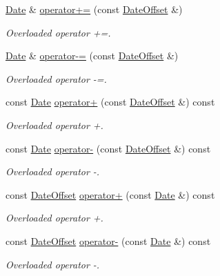 \begin{DoxyCompactItemize}
\hyperlink{class_date}{Date} \& \hyperlink{class_date_a9dd48be596ece427170b034d940b3162}{operator+=} (const \hyperlink{class_date_offset}{Date\+Offset} \&)
\begin{DoxyCompactList}\small\item\em Overloaded operator +=. \end{DoxyCompactList}\item 
\hyperlink{class_date}{Date} \& \hyperlink{class_date_ad8e3dfec1fb54b232246b994ceeaf4de}{operator-\/=} (const \hyperlink{class_date_offset}{Date\+Offset} \&)
\begin{DoxyCompactList}\small\item\em Overloaded operator -\/=. \end{DoxyCompactList}\item 
const \hyperlink{class_date}{Date} \hyperlink{class_date_a76fb6c5f25f2edb5408966f769a378e1}{operator+} (const \hyperlink{class_date_offset}{Date\+Offset} \&) const 
\begin{DoxyCompactList}\small\item\em Overloaded operator +. \end{DoxyCompactList}\item 
const \hyperlink{class_date}{Date} \hyperlink{class_date_ac979d70d595be12cc3bde83149cbe33e}{operator-\/} (const \hyperlink{class_date_offset}{Date\+Offset} \&) const 
\begin{DoxyCompactList}\small\item\em Overloaded operator -\/. \end{DoxyCompactList}\item 
const \hyperlink{class_date_offset}{Date\+Offset} \hyperlink{class_date_a4030ca7cef26e292fc070817e9ee3392}{operator+} (const \hyperlink{class_date}{Date} \&) const 
\begin{DoxyCompactList}\small\item\em Overloaded operator +. \end{DoxyCompactList}\item 
const \hyperlink{class_date_offset}{Date\+Offset} \hyperlink{class_date_a94201a03d802b2f8bc8b45c8a38aac60}{operator-\/} (const \hyperlink{class_date}{Date} \&) const 
\begin{DoxyCompactList}\small\item\em Overloaded operator -\/. \end{DoxyCompactList}\end{DoxyCompactItemize}
